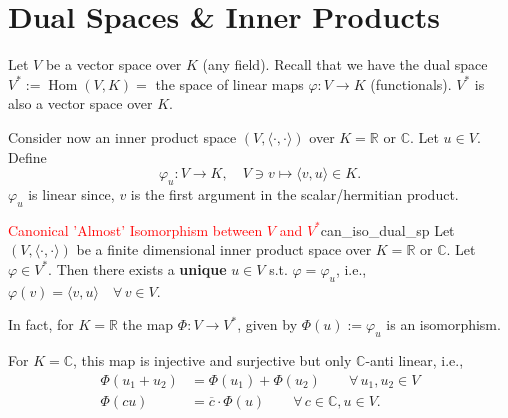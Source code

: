 % 
%
%
%

\section{Dual Spaces \& Inner Products}
Let $V$ be a vector space over $K$ (any field). Recall that we have the dual space $V^{\ast} := \operatorname{Hom}(V, K) =$ the space of linear maps $\varphi :V \to K$ (functionals). $V^{\ast}$ is also a vector space over $K$.

Consider now an inner product space $(V, \langle \cdot , \cdot \rangle)$ over $K = \mathbb{R}$ or $\mathbb{C}$. Let $u \in V$. Define
\[
	\varphi_u :V \to K, \quad V \owns v \mapsto \langle v, u \rangle \in K.
\]
$\varphi_u$ is linear since, $v$ is the first argument in the scalar/hermitian product.

\begin{theorem}{\textcolor{red}{Canonical 'Almost' Isomorphism between $V$ and $V^*$}}{can_iso_dual_sp}
	Let $(V, \langle \cdot, \cdot \rangle)$ be a finite dimensional inner product space over $K = \mathbb{R}$ or $\mathbb{C}$. Let $\varphi \in V^{\ast}$. Then there exists a \textbf{unique} $u \in V$ s.t. $\varphi = \varphi_u$, i.e., $\varphi(v) = \langle v, u \rangle \quad \forall \, v \in V$.
	
	In fact, for $K = \mathbb{R}$ the map $\Phi:V \to V^{\ast}$, given by $\Phi(u):= \varphi_u$ is an isomorphism.
	
	For $K = \mathbb{C}$, this map is injective and surjective but only $\mathbb{C}$-anti linear, i.e.,
	\begin{align*}
		\Phi(u_1 + u_2) &= \Phi(u_1) + \Phi(u_2) \qquad \forall \,  u_1, u_2 \in V\\
		\Phi(c u) &= \overline{c} \cdot \Phi(u) \qquad \forall \, c \in \mathbb{C}, u \in V.
	\end{align*}
\end{theorem}

